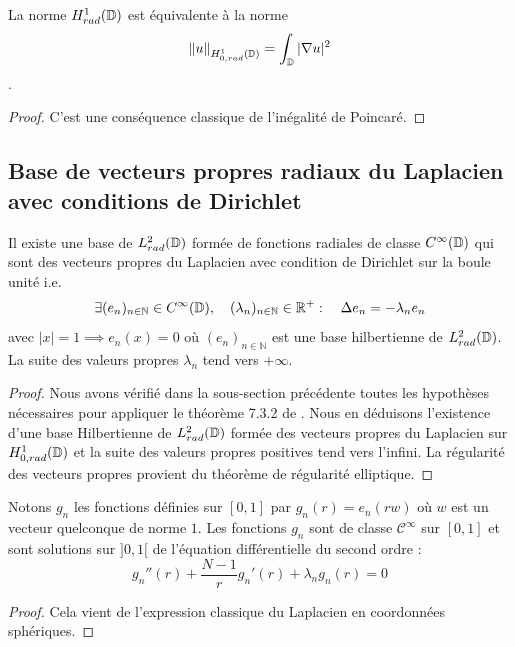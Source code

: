 \documentclass[11pt,a4paper]{article}
\begin{document}
\begin{Prop} La norme $H^1_{rad}(\mathbb{D})$ est équivalente à la norme \[\left\|u\right\|_{H^1_{0,rad}(\mathbb{D})} = \int_{\mathbb{D}} |\nabla u|^2\]. 

\begin{proof}
C'est une conséquence classique de l'inégalité de Poincaré. 
\end{proof}
\end{Prop}




\subsection{Base de vecteurs propres radiaux du Laplacien avec conditions de Dirichlet}

\begin{The} Il existe une base de $L^2_{rad}(\mathbb{D})$ formée de fonctions radiales de classe $C^\infty(\mathbb{D})$ qui sont des vecteurs propres du Laplacien avec condition de Dirichlet sur la boule unité i.e. 
\[\exists (e_n)_{n\in \mathbb{N}} \in C^\infty(\mathbb{D}), \quad (\lambda_n)_{n\in \mathbb{N}} \in \mathbb{R}^+ : \quad \Delta e_n = - \lambda_n e_n\] avec $|x| = 1 \implies e_n(x) = 0$ 
où $(e_n)_{n\in\mathbb{N}}$ est une base hilbertienne de $L^2_{rad}(\mathbb{D})$. La suite des valeurs propres $\lambda_n$ tend vers $+\infty$. 
\begin{proof}
Nous avons vérifié dans la sous-section précédente toutes les hypothèses nécessaires pour appliquer le théorème 7.3.2 de \cite[p. 219]{allaire2005analyse}. Nous en déduisons l'existence d'une base Hilbertienne de $L^2_{rad}(\mathbb{D})$ formée des vecteurs propres du Laplacien sur $H^1_{0,rad}(\mathbb{D})$ et la suite des valeurs propres positives tend vers l'infini. La régularité des vecteurs propres provient du théorème de régularité elliptique. 
\end{proof}
\end{The}

\begin{Prop} Notons $g_n$ les fonctions définies sur $[0,1]$ par $g_n(r) = e_n(rw)$ où $w$ est un vecteur quelconque de norme $1$. Les fonctions $g_n$ sont de classe $\mathcal{C}^{\infty}$ sur $[0,1]$ et sont solutions sur $]0,1[$ de l'équation différentielle du second ordre : 
\begin{equation}g_n''(r) + \frac{N-1}{r} g_n'(r) + \lambda_n g_n(r) = 0    
\label{eqDiffVecPropre}
\end{equation}
\begin{proof}
Cela vient de l'expression classique du Laplacien en coordonnées sphériques. 
\end{proof}
\end{Prop}
\end{document}
